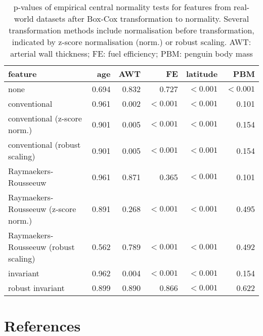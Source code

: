 \documentclass[
  a4paper,
]{article}
\begin{document}
\begin{table}
\begin{center}
\caption{
p-values of empirical central normality tests for features from real-world datasets after Box-Cox transformation to normality.
Several transformation methods include normalisation before transformation, indicated by z-score normalisation (norm.) or robust scaling. 
AWT: arterial wall thickness; FE: fuel efficiency; PBM: penguin body mass}
\label{tab:experimental-results-appendix-p-value-bc}
\begin{tabular}{l | r r r r r}

\toprule
feature & age & AWT & FE & latitude & PBM \\

\midrule

none                                  & 0.694 & 0.832 & 0.727     & $< 0.001$ & $< 0.001$ \\
conventional                          & 0.961 & 0.002 & $< 0.001$ & $< 0.001$ & 0.101 \\
conventional (z-score norm.)          & 0.901 & 0.005 & $< 0.001$ & $< 0.001$ & 0.154 \\
conventional (robust scaling)         & 0.901 & 0.005 & $< 0.001$ & $< 0.001$ & 0.154 \\
Raymaekers-Rousseeuw                  & 0.961 & 0.871 & 0.365     & $< 0.001$ & 0.101 \\
Raymaekers-Rousseeuw (z-score norm.)  & 0.891 & 0.268 & $< 0.001$ & $< 0.001$ & 0.495 \\
Raymaekers-Rousseeuw (robust scaling) & 0.562 & 0.789 & $< 0.001$ & $< 0.001$ & 0.492 \\
invariant                             & 0.962 & 0.004 & $< 0.001$ & $< 0.001$ & 0.154 \\
robust invariant                      & 0.899 & 0.890 & 0.866     & $< 0.001$ & 0.622 \\

\bottomrule
\end{tabular}
\end{center}
\end{table}

\section*{References}\label{references}
\end{document}
